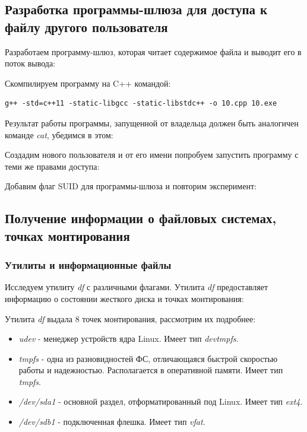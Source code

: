 \documentclass[14pt,a4paper,report]{report}
\begin{document}
\subsection{Разработка программы-шлюза для доступа к файлу другого пользователя}

Разработаем программу-шлюз, которая читает содержимое файла и выводит его в поток вывода:



Скомпилируем программу на C++ командой:

\begin{verbatim}
g++ -std=c++11 -static-libgcc -static-libstdc++ -o 10.cpp 10.exe
\end{verbatim}

Результат работы программы, запущенной от владельца должен быть аналогичен команде \emph{cat}, убедимся в этом:



Создадим нового пользователя и от его имени попробуем запустить программу с теми же правами доступа:



Добавим флаг SUID для программы-шлюза и повторим эксперимент:



\subsection{Получение информации о файловых системах, точках монтирования}

\subsubsection{Утилиты и информационные файлы}

Исследуем утилиту \emph{df} с различными флагами. Утилита \emph{df} предоставляет информацию о состоянии жесткого диска и точках монтирования:



Утилита \emph{df} выдала 8 точек монтирования, рассмотрим их подробнее:

\begin{itemize}
	\item \emph{udev} - менеджер устройств ядра Linux. Имеет тип \emph{devtmpfs}.
	\item \emph{tmpfs} - одна из разновидностей ФС, отличающаяся быстрой скоростью работы и надежностью. Располагается в оперативной памяти. Имеет тип \emph{tmpfs}.
	\item \emph{/dev/sda1} - основной раздел, отформатированный под Linux. Имеет тип \emph{ext4}.
	\item \emph{/dev/sdb1} - подключенная флешка. Имеет тип \emph{vfat}.
\end{itemize}
\end{document}
